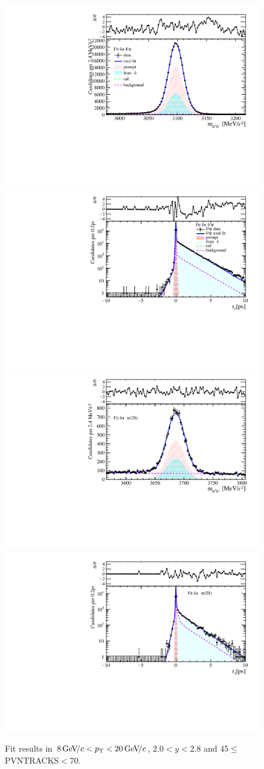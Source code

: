 \begin{figure}[H]
\begin{center}
\includegraphics[width=0.47\linewidth]{pdf/Jpsi/drawmass/n3y1pt5.pdf}
\includegraphics[width=0.47\linewidth]{pdf/Jpsi/2DFit/n3y1pt5.pdf}
\vspace*{-0.5cm}
\includegraphics[width=0.47\linewidth]{pdf/Psi2S/drawmass/n3y1pt5.pdf}
\includegraphics[width=0.47\linewidth]{pdf/Psi2S/2DFit/n3y1pt5.pdf}
\vspace*{-0.5cm}
\end{center}
\caption{Fit results in $8\text{\,Ge\kern -0.1em V\!/}c<p_{\mathrm{T}}<20\text{\,Ge\kern -0.1em V\!/}c$, $2.0<y<2.8$ and 45$\leq$PVNTRACKS$<$70.}
\label{Fitn3y1pt5}
\end{figure}
